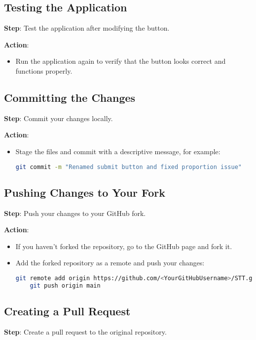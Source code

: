 \documentclass[a4paper,12pt]{article}
\begin{document}
\subsection{Testing the Application}
\textbf{Step}: Test the application after modifying the button.

\textbf{Action}: 
\begin{itemize}
    \item Run the application again to verify that the button looks correct and functions properly.
\end{itemize}

\subsection{Committing the Changes}
\textbf{Step}: Commit your changes locally.

\textbf{Action}:
\begin{itemize}
    \item Stage the files and commit with a descriptive message, for example:
    \begin{lstlisting}[language=bash]
    git commit -m "Renamed submit button and fixed proportion issue"
    \end{lstlisting}
\end{itemize}

\subsection{Pushing Changes to Your Fork}
\textbf{Step}: Push your changes to your GitHub fork.

\textbf{Action}:
\begin{itemize}
    \item If you haven’t forked the repository, go to the GitHub page and fork it.
    \item Add the forked repository as a remote and push your changes:
    \begin{lstlisting}[language=bash]
    git remote add origin https://github.com/<YourGitHubUsername>/STT.git
    git push origin main
    \end{lstlisting}
\end{itemize}

\subsection{Creating a Pull Request}
\textbf{Step}: Create a pull request to the original repository.
\end{document}

